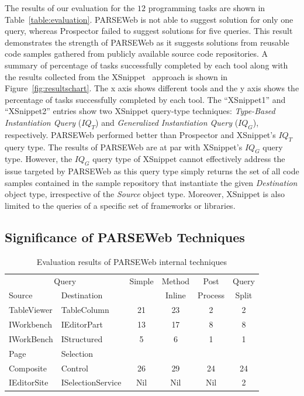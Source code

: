 The results of our evaluation for the $12$ programming
tasks are shown in Table~\ref{table:evaluation}. PARSEWeb is not able to suggest
solution for only one query, whereas Prospector failed to suggest
solutions for five queries. This result demonstrates the strength of
PARSEWeb as it suggests solutions from reusable code samples
gathered from publicly available source code repositories. A summary
of percentage of tasks successfully completed by each tool along
with the results collected from the XSnippet~\cite{xsnippet:saha}
approach is shown in Figure~\ref{fig:resultschart}. The x axis
shows different tools and the y axis shows the percentage of tasks
successfully completed by each tool. The ``XSnippet1'' and
``XSnippet2'' entries show two XSnippet query-type techniques:
\emph{Type-Based Instantiation Query} ($IQ_{T}$) and
\emph{Generalized Instantiation Query} ($IQ_{G}$), respectively.
PARSEWeb performed better than Prospector and XSnippet's $IQ_{T}$
query type. The results of PARSEWeb are at par with XSnippet's
$IQ_{G}$ query type. However, the $IQ_{G}$ query type of XSnippet
cannot effectively address the issue targeted by PARSEWeb as
this query type simply returns the set of all code samples contained in the
sample repository that instantiate the given \emph{Destination}
object type, irrespective of the \emph{Source} object type. Moreover, XSnippet
is also limited to the queries of a specific set of frameworks or
libraries.
\subsection{Significance of PARSEWeb Techniques}
\label{sec:parsewebtech}
\setlength{\tabcolsep}{1pt}
\begin{table}[t]
\begin{SmallOut}
\begin{CodeOut}
\begin{center}
\centering \caption {\label{tab:internaltech} Evaluation results
 of PARSEWeb internal techniques}
\begin {tabular} {|l|l|c|c|c|c|}
\hline
\multicolumn{2}{|c|}{Query}&Simple&Method&Post&Query\\
\cline{1-2}
Source&Destination&&Inline&Process&Split\\
\hline
\hline TableViewer&TableColumn&21&23&2&2\\
\hline IWorkbench&IEditorPart&13&17&8&8\\
\hline IWorkBench&IStructured&5&6&1&1\\
             Page&Selection&&&&\\
\hline Composite&Control&26&29&24&24\\
\hline IEditorSite&ISelectionService&Nil&Nil&Nil&2\\
\hline
\end{tabular}
\end{center}
\end{CodeOut}
\end{SmallOut}
\vspace*{-4ex}
\end{table}

